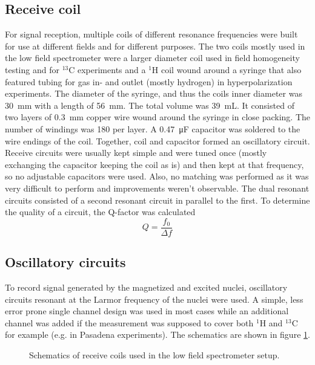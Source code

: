         \subsection{Receive coil}
        \label{sec:matMeth:receiveCoil}
        For signal reception, multiple coils of different resonance frequencies were built for use at different fields and for different purposes. The two coils mostly used in the low field spectrometer were a larger diameter coil used in field homogeneity testing and for $^{13}$C experiments and a $^{1}$H coil wound around a syringe that also featured tubing for gas in- and outlet (mostly hydrogen) in hyperpolarization experiments. The diameter of the syringe, and thus the coils inner diameter was \SI{30}{\mm} with a length of \SI{56}{\milli\meter}. The total volume was \SI{39}{\milli\liter}. It consisted of two layers of \SI{0.3}{\milli\meter} copper wire wound around the syringe in close packing. The number of windings was 180 per layer. A \SI{0.47}{\micro\farad} capacitor was soldered to the wire endings of the coil. Together, coil and capacitor formed an oscillatory circuit. 
        Receive circuits were usually kept simple and were tuned once (mostly exchanging the capacitor keeping the coil as is) and then kept at that frequency, so no adjustable capacitors were used. Also, no matching was performed as it was very difficult to perform and improvements weren't observable. The dual resonant circuits consisted of a second resonant circuit in parallel to the first. To determine the quality of a circuit, the Q-factor was calculated
        \begin{equation}
            Q = \frac{f_0}{\Delta f}
        \end{equation}
        \subsection{Oscillatory circuits}
        \label{sec:matMeth:oscillatoryCircuits}
        To record signal generated by the magnetized and excited nuclei, oscillatory circuits resonant at the Larmor frequency of the nuclei were used. A simple, less error prone single channel design was used in most cases while an additional channel was added if the measurement was supposed to cover both $^{1}$H and $^{13}$C for example (e.g. in Pasadena experiments). The schematics are shown in figure \ref{fig:matMeth:oscillatoryCircuits}.
        \begin{figure}
            \caption[Recieve coil schematics]{Schematics of receive coils used in the low field spectrometer setup.}
            \label{fig:matMeth:oscillatoryCircuits}
        \end{figure}
